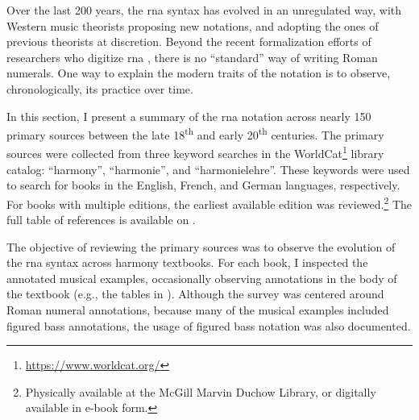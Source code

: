 

Over the last 200 years, the \gls{rna} syntax has evolved in
an unregulated way, with Western music theorists proposing
new notations, and adopting the ones of previous theorists
at discretion. Beyond the recent formalization efforts of
researchers who digitize \gls{rna}
\parencite{huron1994humdrum, napoleslopez2017automatic,
neuwirth2018annotated, gotham2019romantext,
napoleslopez2020harmalysis, hentschel2021annotated}, there
is no ``standard'' way of writing Roman numerals. One way to
explain the modern traits of the notation is to observe,
chronologically, its practice over time.

In this section, I present a summary of the \gls{rna}
notation across nearly 150 primary sources between the late
18\textsuperscript{th} and early 20\textsuperscript{th}
centuries. The primary sources were collected from three
keyword searches in the
WorldCat\footnote{\href{https://www.worldcat.org/}{https://www.worldcat.org/}}
library catalog: ``harmony'', ``harmonie'', and
``harmonielehre''. These keywords were used to search for
books in the English, French, and German languages,
respectively. For books with multiple editions, the earliest
available edition was reviewed.\footnote{Physically
available at the McGill Marvin Duchow Library, or digitally
available in e-book form.} The full table of references is
available on .



The objective of reviewing the primary sources was to
observe the evolution of the \gls{rna} syntax across harmony
textbooks. For each book, I inspected the annotated musical
examples, occasionally observing annotations in the body of
the textbook (e.g., the tables in
\textcite{kirnberger1774kunst}). Although the survey was
centered around Roman numeral annotations, because many of
the musical examples included figured bass annotations, the
usage of figured bass notation was also documented. 


